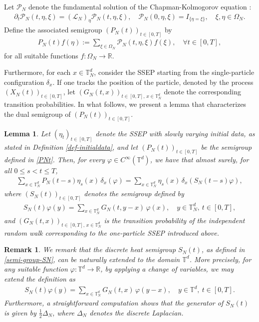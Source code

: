 \documentclass[UTF-8,reqno]{amsart}
\numberwithin{equation}{section}
\newtheorem{lemma}[theorem]{Lemma}
\newtheorem{remark}[theorem]{Remark}
\def\leq{\leqslant}
\def\leq{\leqslant}
\begin{document}
Let $\mathcal{P}_N$ denote the fundamental solution of the Chapman-Kolmogorov equation \cite{KL99}:  
\begin{align*}
\partial_t\mathcal{P}_N(t,\eta,\xi)=(\mathcal{L}_N)_{\eta}\mathcal{P}_N(t,\eta,\xi),\quad \mathcal{P}_N(0,\eta,\xi)=I_{\{\eta=\xi\}},\quad \xi,\eta\in\Omega_N. 	
\end{align*}
Define the associated semigroup $(P_N(t))_{t\in[0,T]}$ by
\begin{align}\label{PNt}
P_N(t)f(\eta):=\sum_{\xi\in\Omega_N}\mathcal{P}_N(t,\eta,\xi)f(\xi),\quad\forall t\in[0,T], 	
\end{align}
for all suitable functions $f:\Omega_N\rightarrow\mathbb{R}$.

Furthermore, for each $x\in\mathbb{T}^d_N$, consider the SSEP starting from the single-particle configuration $\delta_x$. If one tracks the position of the particle, denoted by the process $(X_N(t))_{t\in[0,T]}$, let $(G_N(t,x))_{t\in[0,T],\,x\in\mathbb{T}^d_N}$ denote the corresponding transition probabilities. In what follows, we present a lemma that characterizes the dual semigroup of $(P_N(t))_{t\in[0,T]}$.
\begin{lemma}\label{dual-semigroup}
Let $(\eta_t)_{t\in[0,T]}$ denote the SSEP with slowly varying initial data, as stated in Definition \ref{def-initialdata}, and let $(P_N(t))_{t\in[0,T]}$ be the semigroup defined in \eqref{PNt}. Then, for every $\varphi \in C^{\infty}(\mathbb{T}^d)$, we have that almost surely, for all $0 \leq s < t \leq T$,
\begin{align*}
\sum_{x\in\mathbb{T}^d_N} P_N(t-s)\eta_s(x) \, \delta_{x}(\varphi) = \sum_{x\in\mathbb{T}^d_N} \eta_s(x) \, \delta_{x}(S_N(t-s)\varphi),
\end{align*}
where $(S_N(t))_{t\in[0,T]}$ denotes the semigroup defined by
\begin{align}\label{semi-group-SN}
S_N(t)\varphi(y) = \sum_{x\in\mathbb{T}^d_N} G_N(t, y - x) \, \varphi(x), \quad y \in \mathbb{T}^d_N, \ t \in [0,T],
\end{align}
and $(G_N(t,x))_{t\in[0,T],\,x\in\mathbb{T}^d_N}$ is the transition probability of the independent random walk corresponding to the one-particle SSEP introduced above.
\end{lemma}

\begin{remark}
We remark that the discrete heat semigroup $S_N(t)$, as defined in \eqref{semi-group-SN}, can be naturally extended to the domain $\mathbb{T}^d$. More precisely, for any suitable function $\varphi:\mathbb{T}^d \to \mathbb{R}$, by applying a change of variables, we may extend the definition as  
\begin{align*}
S_N(t)\varphi(y) = \sum_{x \in \mathbb{T}^d_N} G_N(t, x)\, \varphi(y-x), 
\quad y \in \mathbb{T}^d,\ t \in [0,T].
\end{align*}
Furthermore, a straightforward computation shows that the generator of $S_N(t)$ is given by $\frac{1}{2}\Delta_N$, where $\Delta_N$ denotes the discrete Laplacian. 
\end{remark}
\end{document}
